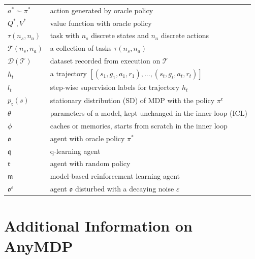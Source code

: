 \documentclass{article}
\begin{document}
\begin{table}[t]
\begin{center}
\begin{small}
\begin{sc}
\begin{tabular}{ll}
$a^* \sim \pi^*$ & action generated by oracle policy \\
$Q^*, V^*$ & value function with oracle policy \\
$\tau(n_s, n_a)$ & task with $n_s$ discrete states and $n_a$ discrete actions\\
$\mathcal{T}(n_s, n_a)$ & a collection of tasks $\tau(n_s, n_a)$ \\
$\mathcal{D}(\mathcal{T})$ & dataset recorded from execution on $\mathcal{T}$ \\
$h_t$ & a trajectory $[(s_1, g_1, a_1, r_1), ..., (s_t, g_t, a_t, r_t)]$ \\
$l_t$ & step-wise supervision labels for trajectory $h_t$ \\
$p_{\mathfrak{r}}(s)$ & stationary distribution (SD) of MDP with the policy $\pi^{\mathfrak{r}}$ \\
$\theta$ & parameters of a model, kept unchanged in the inner loop (ICL) \\
$\phi$ & caches or memories, starts from scratch in the inner loop \\
$\mathfrak{o}$ & agent with oracle policy $\pi^*$ \\
$\mathfrak{q}$ & q-learning agent \\
$\mathfrak{r}$ & agent with random policy \\
$\mathfrak{m}$ & model-based reinforcement learning agent \\
$\mathfrak{o}^\varepsilon$ & agent $\mathfrak{o}$ disturbed with a decaying noise $\varepsilon$ \\
\bottomrule
\end{tabular}
\end{sc}
\end{small}
\end{center}
\vskip -0.1in
\end{table}
\section{Additional Information on AnyMDP}\label{sec:add_anymdp}
\end{document}
